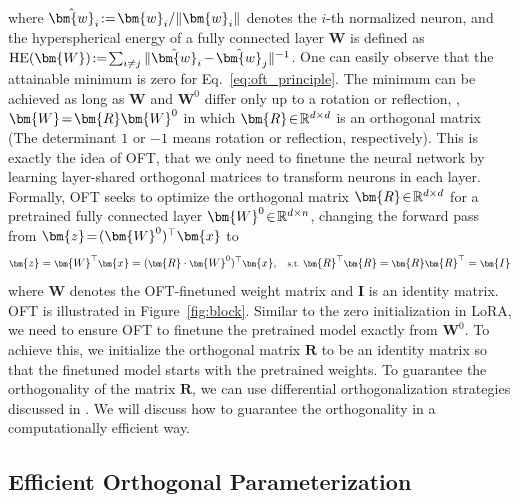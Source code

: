 where $\thickmuskip=2mu \medmuskip=2mu \hat{\bm{w}}_i:=\bm{w}_i/\|\bm{w}_i\|$ denotes the $i$-th normalized neuron, and the hyperspherical energy of a fully connected layer $\bm{W}$ is defined as $\thickmuskip=2mu \medmuskip=2mu \text{HE}(\bm{W}):= \sum_{i\neq j} \|\hat{\bm{w}}_i-\hat{\bm{w}}_j\|^{-1}$. One can easily observe that the attainable minimum is zero for Eq.~\eqref{eq:oft_principle}. The minimum can be achieved as long as $\bm{W}$ and $\bm{W}^0$ differ only up to a rotation or reflection, \ie, $\thickmuskip=2mu \medmuskip=2mu \bm{W}=\bm{R}\bm{W}^0$ in which $\thickmuskip=2mu \medmuskip=2mu \bm{R}\in\mathbb{R}^{d\times d}$ is an orthogonal matrix (The determinant $1$ or $-1$ means rotation or reflection, respectively). This is exactly the idea of OFT, that we only need to finetune the neural network by learning layer-shared orthogonal matrices to transform neurons in each layer. Formally, OFT seeks to optimize the orthogonal matrix $\thickmuskip=2mu \medmuskip=2mu \bm{R}\in\mathbb{R}^{d \times d}$ for a pretrained fully connected layer $\thickmuskip=2mu \medmuskip=2mu\bm{W}^0\in\mathbb{R}^{d\times n}$, changing the forward pass from $\thickmuskip=2mu \medmuskip=2mu\bm{z}=(\bm{W}^0)^\top\bm{x}$ to
\begin{equation}\label{eq:oft_general}
    \footnotesize
    \bm{z}=\bm{W}^\top\bm{x}=(\bm{R}\cdot\bm{W}^0)^\top\bm{x},~~~\text{s.t.}~\bm{R}^\top\bm{R}=\bm{R}\bm{R}^\top=\bm{I}
\end{equation}
where $\bm{W}$ denotes the OFT-finetuned weight matrix and $\bm{I}$ is an identity matrix. OFT is illustrated in Figure~\ref{fig:block}. Similar to the zero initialization in LoRA, we need to ensure OFT to finetune the pretrained model exactly from $\bm{W}^0$. To achieve this, we initialize the orthogonal matrix $\bm{R}$ to be an identity matrix so that the finetuned model starts with the pretrained weights. To guarantee the orthogonality of the matrix $\bm{R}$, we can use differential orthogonalization strategies discussed in \cite{liu2021orthogonal,lezcano2019cheap}. We will discuss how to guarantee the orthogonality in a computationally efficient way.

\vspace{-0.9mm}
\subsection{Efficient Orthogonal Parameterization}\label{sect:eff_ortho}
\vspace{-0.9mm}



